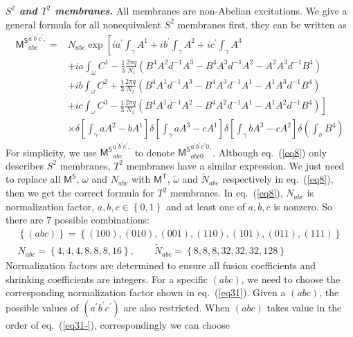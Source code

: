 \documentclass[11pt,nofootinbib,preprint]{revtex4-1}
\begin{document}
\textbf{\textit{$S^2$ and $T^2$ membranes.}}
All membranes are non-Abelian excitations. We give a general formula for all nonequivalent $S^2$ membranes first, they can be written as 
\begin{align}
	\mathsf{M^S}_{abc}^{a^{\prime}b^{\prime}c^{\prime},}=&N_{abc}\exp \left[ ia^{\prime}\int_{\gamma}{A^1}+ib^{\prime}\int_{\gamma}{A^2}+ic^{\prime}\int_{\gamma}{A^3} \right. \nonumber
	\\
	&+ia\int_{\omega}{C^1-\frac{1}{3}\frac{2\pi q}{N_1}\left( B^4A^2d^{-1}A^3-B^4A^3d^{-1}A^2-A^2A^3d^{-1}B^4 \right)} \nonumber
	\\
	&+ib\int_{\omega}{C^2+\frac{1}{3}\frac{2\pi q}{N_2}\left( B^4A^1d^{-1}A^3-B^4A^3d^{-1}A^1-A^1A^3d^{-1}B^4 \right)} \nonumber
	\\
	&+\left. ic\int_{\omega}{C^3-\frac{1}{3}\frac{2\pi q}{N_3}\left( B^4A^1d^{-1}A^2-B^4A^2d^{-1}A^1-A^1A^2d^{-1}B^4 \right)} \right]  \nonumber
	\\
	&\times \delta \left[ \int_{\gamma}{aA^2-bA^1} \right] \delta \left[ \int_{\gamma}{aA^3-cA^1} \right] \delta \left[ \int_{\gamma}{bA^3-cA^2} \right] \delta \left( \int_{\sigma}{B^4} \right)  	
	\label{eq8}
\end{align}
For simplicity, we use $\mathsf{M^S}_{abc}^{a^{\prime}b^{\prime}c^{\prime},}$ to denote $\mathsf{M^S}_{abc0}^{a^{\prime}b^{\prime}c^{\prime}0,}$. Although eq.~(\ref{eq8}) only describes $S^2$ membranes, $T^2$ membranes have a similar expression. We just need to replace all $\mathsf{M^S}$, $\omega$ and $N_{abc}$ with $\mathsf{M^T}$, $\tilde{\omega}$ and $\tilde{N}_{abc}$ respectively in eq.~(\ref{eq8}), then we get the correct formula for $T^2$ membranes. In eq.~(\ref{eq8}), $N_{abc}$ is normalization factor, $a,b,c\in \left\{ 0,1 \right\} $ and at least one of $a,b,c$ is nonzero. So there are $7$ possible combinations:
\begin{gather}
	\left\{ \left( abc \right) \right\} =\left\{ \left( 100 \right) ,\left( 010 \right) ,\left( 001 \right) ,\left( 110 \right) ,\left( 101 \right) ,\left( 011 \right) ,\left( 111 \right) \right\}
	\label{eq31-}  
	\\
	N_{abc}=\left\{4,4,4,8,8,8,16\right\},\qquad\tilde{N}_{abc}=\left\{8,8,8,32,32,32,128\right\}
	\label{eq31}
\end{gather}
Normalization factors are determined to ensure all fusion coefficients and shrinking coefficients are integers. For a specific $\left( abc \right)$, we need to choose the corresponding normalization factor shown in eq.~(\ref{eq31}). Given a $\left( abc \right)$, the possible values of $\left( a^{\prime}b^{\prime}c^{\prime} \right)$ are also restricted. When $\left( abc \right)$ takes value in the order of eq.~(\ref{eq31-}), correspondingly we can choose
\end{document}
